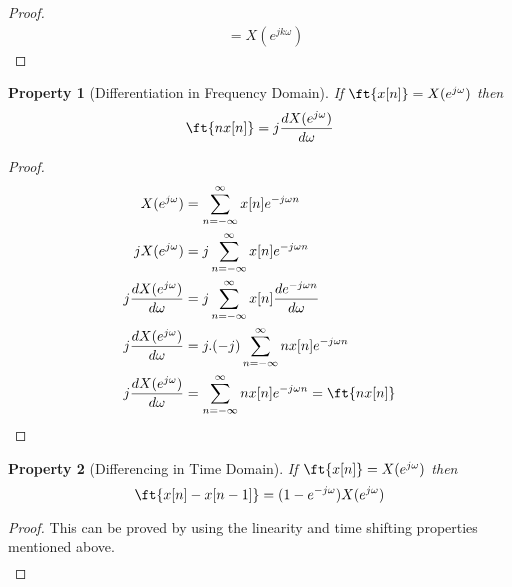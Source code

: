 \documentclass{home_assignment}
\newtheorem{theorem}{Property}
\begin{document}
{\begin{proof}
\begin{equation*}
\begin{aligned}
                &=X(e^{jk\omega})
                \end{aligned}
                \end{equation*}
                \end{proof}
                \begin{theorem}[Differentiation in Frequency Domain]
                    If $\ft{x[n]}=X(e^{j\omega})$ then
                    \begin{equation*}
                    \ft{nx[n]}=j\frac{dX(e^{j\omega})}{d\omega}
                    \end{equation*}
                    \end{theorem}
                    \begin{proof}
                    \begin{equation*}
                    \begin{aligned} 
                    X(e^{j\omega})&=\sum_{n=-\infty}^{\infty} x[n] e^{-j\omega n} \\
                    j X(e^{j\omega})&=j\sum_{n=-\infty}^{\infty} x[n] e^{-j\omega n}\\
                    j\frac{dX(e^{j\omega})}{d\omega}&=j\sum_{n=-\infty}^{\infty} x[n] \frac{de^{-j\omega n}}{d\omega}\\
                    j\frac{dX(e^{j\omega})}{d\omega}&=j.(-j)\sum_{n=-\infty}^{\infty} nx[n] e^{-j\omega n}\\
                    j\frac{dX(e^{j\omega})}{d\omega}&=\sum_{n=-\infty}^{\infty} nx[n] e^{-j\omega n}=\ft{nx[n]}\\
                    \end{aligned}
                    \end{equation*}
                    \end{proof}
                    \begin{theorem}[Differencing in Time Domain]
                        If $\ft{x[n]}=X(e^{j\omega})$ then
                        \begin{equation*}
                        \ft{x[n]-x[n-1]}=(1-e^{-j\omega})X(e^{j\omega})
                        \end{equation*}
                        \end{theorem}
                        \begin{proof}This can be proved by using the linearity and time shifting properties mentioned above.
                        \begin{equation*}
                        \begin{aligned} 

\end{aligned}
\end{equation*}
\end{proof}}
\end{document}
